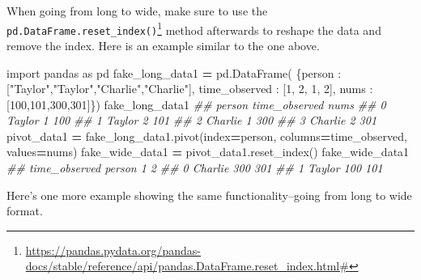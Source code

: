 \documentclass[
  12pt,
  krantz2]{krantz}
\makeatletter
\newenvironment{Shaded}{\begin{snugshade}}{\end{snugshade}}
\newcommand{\CommentTok}[1]{\textcolor[rgb]{0.37,0.37,0.37}{\textit{#1}}}
\newcommand{\DecValTok}[1]{\textcolor[rgb]{0.06,0.06,0.06}{#1}}
\newcommand{\ImportTok}[1]{#1}
\newcommand{\NormalTok}[1]{#1}
\newcommand{\OperatorTok}[1]{\textcolor[rgb]{0.43,0.43,0.43}{\textbf{#1}}}
\newcommand{\StringTok}[1]{\textcolor[rgb]{0.5,0.5,0.5}{#1}}
\renewcommand{\href}[2]{#2\footnote{\url{#1}}}
\newenvironment{kframe}{%
\medskip{}
\setlength{\fboxsep}{.8em}
 \def\at@end@of@kframe{}%
 \ifinner\ifhmode%
  \def\at@end@of@kframe{\end{minipage}}%
  \begin{minipage}{\columnwidth}%
 \fi\fi%
 \def\FrameCommand##1{\hskip\@totalleftmargin \hskip-\fboxsep
 \colorbox{shadecolor}{##1}\hskip-\fboxsep
     \hskip-\linewidth \hskip-\@totalleftmargin \hskip\columnwidth}%
 \MakeFramed {\advance\hsize-\width
   \@totalleftmargin\z@ \linewidth\hsize
   \@setminipage}}%
 {\par\unskip\endMakeFramed%
 \at@end@of@kframe}
\renewenvironment{Shaded}{\begin{kframe}}{\end{kframe}}
\makeatother
\begin{document}
When going from long to wide, make sure to use the \href{https://pandas.pydata.org/pandas-docs/stable/reference/api/pandas.DataFrame.reset_index.html\#}{\texttt{pd.DataFrame.reset\_index()}} method afterwards to reshape the data and remove the index. Here is an example similar to the one above.

\begin{Shaded}
\begin{Highlighting}[]
\ImportTok{import}\NormalTok{ pandas }\ImportTok{as}\NormalTok{ pd}
\NormalTok{fake\_long\_data1 }\OperatorTok{=}\NormalTok{ pd.DataFrame(}
\NormalTok{  \{}\StringTok{\textquotesingle{}person\textquotesingle{}}\NormalTok{ : [}\StringTok{"Taylor"}\NormalTok{,}\StringTok{"Taylor"}\NormalTok{,}\StringTok{"Charlie"}\NormalTok{,}\StringTok{"Charlie"}\NormalTok{], }
  \StringTok{\textquotesingle{}time\_observed\textquotesingle{}}\NormalTok{ : [}\DecValTok{1}\NormalTok{, }\DecValTok{2}\NormalTok{, }\DecValTok{1}\NormalTok{, }\DecValTok{2}\NormalTok{],}
  \StringTok{\textquotesingle{}nums\textquotesingle{}}\NormalTok{ : [}\DecValTok{100}\NormalTok{,}\DecValTok{101}\NormalTok{,}\DecValTok{300}\NormalTok{,}\DecValTok{301}\NormalTok{]\})}
\NormalTok{fake\_long\_data1}
\CommentTok{\#\#     person  time\_observed  nums}
\CommentTok{\#\# 0   Taylor              1   100}
\CommentTok{\#\# 1   Taylor              2   101}
\CommentTok{\#\# 2  Charlie              1   300}
\CommentTok{\#\# 3  Charlie              2   301}
\NormalTok{pivot\_data1 }\OperatorTok{=}\NormalTok{ fake\_long\_data1.pivot(index}\OperatorTok{=}\StringTok{\textquotesingle{}person\textquotesingle{}}\NormalTok{, }
\NormalTok{                                    columns}\OperatorTok{=}\StringTok{\textquotesingle{}time\_observed\textquotesingle{}}\NormalTok{, }
\NormalTok{                                    values}\OperatorTok{=}\StringTok{\textquotesingle{}nums\textquotesingle{}}\NormalTok{)}
\NormalTok{fake\_wide\_data1 }\OperatorTok{=}\NormalTok{ pivot\_data1.reset\_index()}
\NormalTok{fake\_wide\_data1}
\CommentTok{\#\# time\_observed   person    1    2}
\CommentTok{\#\# 0              Charlie  300  301}
\CommentTok{\#\# 1               Taylor  100  101}
\end{Highlighting}
\end{Shaded}

Here's one more example showing the same functionality--going from long to wide format.
\end{document}
